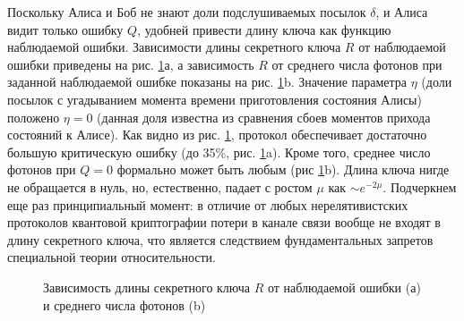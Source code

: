 Поскольку Алиса и Боб не знают доли подслушиваемых посылок $\delta$, и Алиса видит только ошибку $Q$, удобней привести длину ключа как функцию наблюдаемой ошибки. Зависимости длины секретного ключа $R$ от наблюдаемой ошибки приведены на рис. \ref{fig:key_rate}а, а зависимость $R$ от среднего числа фотонов при заданной наблюдаемой ошибке показаны на рис. \ref{fig:key_rate}b.
Значение параметра $\eta$ (доли посылок с угадыванием момента времени приготовления состояния Алисы) положено $\eta = 0$ (данная доля известна из сравнения сбоев моментов прихода состояний к Алисе). Как видно из рис. \ref{fig:key_rate}, протокол обеспечивает достаточно большую критическую ошибку (до 35\%, рис. \ref{fig:key_rate}a). Кроме того, среднее число фотонов при $Q=0$ формально может быть любым (рис \ref{fig:key_rate}b). Длина ключа нигде не обращается в нуль, но, естественно, падает с ростом $\mu$ как $\sim e^{-2\mu}$. Подчеркнем еще раз принципиальный момент: в отличие от любых нерелятивистских протоколов квантовой криптографии потери в канале связи вообще не входят в длину секретного ключа, что является следствием фундаментальных запретов специальной теории относительности.

\begin{figure}[h]
  \caption{Зависимость длины секретного ключа $R$ от наблюдаемой ошибки (а) и среднего числа фотонов (b)}
  \label{fig:key_rate}
  \end{figure}
